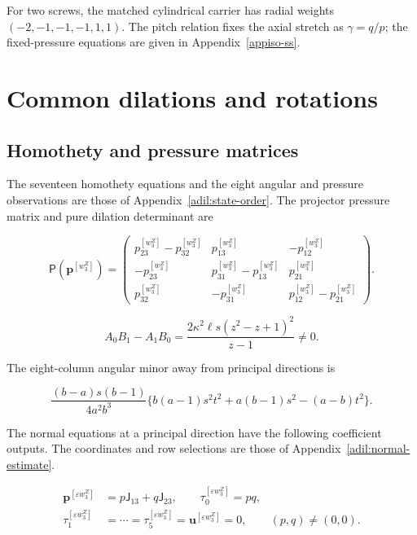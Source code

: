 For two screws, the matched cylindrical carrier has radial weights
$(-2,-1,-1,-1,1,1)$. The pitch relation fixes the axial stretch as
$\gamma=q/p$; the fixed-pressure equations are given in
Appendix~\ref{appiso-ss}.

\clearpage
\section{Common dilations and rotations}\label{supp:dilations}

\subsection{Homothety and pressure matrices}

The seventeen homothety equations and the eight angular and pressure
observations are those of Appendix~\ref{adil:state-order}.
The projector pressure matrix and pure dilation determinant are

\begin{equation}\label{supp:dil:pressure-matrix}
 \mathsf P(\boldsymbol p^{[w_3^Z]})=
 \begin{pmatrix}
 p_{23}^{[w_3^Z]}-p_{32}^{[w_3^Z]}&p_{13}^{[w_3^Z]}&-p_{12}^{[w_3^Z]}\\
 -p_{23}^{[w_3^Z]}&p_{31}^{[w_3^Z]}-p_{13}^{[w_3^Z]}&p_{21}^{[w_3^Z]}\\
 p_{32}^{[w_3^Z]}&-p_{31}^{[w_3^Z]}&p_{12}^{[w_3^Z]}-p_{21}^{[w_3^Z]}
 \end{pmatrix}.
\end{equation}

\begin{equation}\label{supp:dil:pure-final-minor}
 A_0B_1-A_1B_0
   =\frac{2\kappa^2\ell s(z^2-z+1)^2}{z-1}\ne0.
\end{equation}

The eight-column angular minor away from principal directions is

\begin{equation}\label{supp:dil:eight-minor}
 \frac{(b-a)s(b-1)}{4a^2b^3}
 \{b(a-1)s^2t^2+a(b-1)s^2-(a-b)t^2\}.
\end{equation}

The normal equations at a principal direction have the following
coefficient outputs. The coordinates and row selections are those
of Appendix~\ref{adil:normal-estimate}.

\begin{equation}\label{supp:dil:infinity-plane}
 \begin{aligned}
 \boldsymbol p^{[\varepsilon w_3^Z]}&=p\mathsf J_{13}+q\mathsf J_{23},\qquad \tau_0^{[\varepsilon w_3^Z]}=pq,\\
 \tau_1^{[\varepsilon w_3^Z]}&=\cdots=\tau_5^{[\varepsilon w_3^Z]}=\boldsymbol u^{[\varepsilon w_3^Z]}=0,\qquad (p,q)\ne(0,0).
 \end{aligned}
\end{equation}


